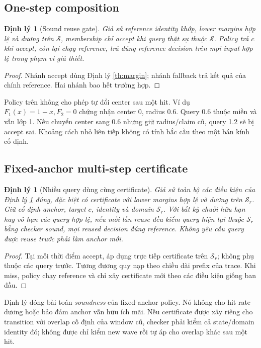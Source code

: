 \documentclass[11pt,a4paper]{article}
\newcommand{\Sset}{\mathcal S}
\newtheorem{theorem}[definition]{Định lý}
\theoremstyle{remark}
\begin{document}
\subsection{One-step composition}
\begin{theorem}[Sound reuse gate]\label{th:gate}
Giả sử reference identity khớp, lower margins hợp lệ và dương trên $\Sset$,
membership chỉ accept khi query thật sự thuộc $\Sset$. Policy trả $c$ khi
accept, còn lại chạy reference, trả đúng reference decision trên mọi
input hợp lệ trong phạm vi giả thiết.
\end{theorem}
\begin{proof}
Nhánh accept dùng Định lý \ref{th:margin}; nhánh fallback trả kết quả của
chính reference. Hai nhánh bao hết trường hợp.
\end{proof}
Policy trên không cho phép tự đổi center sau một hit. Ví dụ
$F_1(x)=1-x,F_2=0$ chứng nhận center 0, radius 0.6. Query 0.6 thuộc miền
và vẫn lớp 1. Nếu chuyển center sang 0.6 nhưng giữ radius/claim cũ, query
1.2 sẽ bị accept sai. Khoảng cách nhỏ liên tiếp không có tính bắc cầu
theo một bán kính cố định.

\subsection{Fixed-anchor multi-step certificate}
\begin{theorem}[Nhiều query dùng cùng certificate]\label{th:fixed}
Giả sử toàn bộ các điều kiện của Định lý \ref{th:gate} đúng, đặc biệt có
certificate với lower margins hợp lệ và dương trên $\Sset_r$. Giữ cố định
anchor, target $c$, identity và domain $\Sset_r$. Với bất kỳ
chuỗi hữu hạn hay vô hạn các query hợp lệ, nếu mỗi lần reuse đều kiểm
query hiện tại thuộc $\Sset_r$ bằng checker sound, mọi reused decision đúng
reference. Không yêu cầu query được reuse trước phải làm anchor mới.
\end{theorem}
\begin{proof}
Tại mỗi thời điểm accept, áp dụng trực tiếp certificate trên $\Sset_r$;
không phụ thuộc các query trước. Tương đương quy nạp theo chiều dài prefix
của trace. Khi miss, policy chạy reference và chỉ xây certificate mới theo
các điều kiện giống ban đầu.
\end{proof}
Định lý đóng bài toán \emph{soundness} của fixed-anchor policy. Nó không
cho hit rate dương hoặc bảo đảm anchor vẫn hữu ích mãi. Nếu certificate
được xây riêng cho transition với overlap cố định của window cũ, checker
phải kiểm cả state/domain identity đó; không được chỉ kiểm new wave rồi
tự áp cho overlap khác sau một hit.
\end{document}
